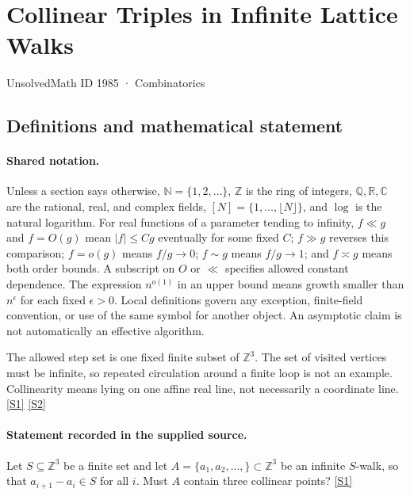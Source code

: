 \documentclass[11pt,a4paper]{article}
\newcommand{\N}{\mathbb{N}}
\newcommand{\Z}{\mathbb{Z}}
\newcommand{\Q}{\mathbb{Q}}
\newcommand{\R}{\mathbb{R}}
\newcommand{\C}{\mathbb{C}}
\newcommand{\sref}[2]{\hyperlink{source:#1:#2}{[S#2]}}
\begin{document}

\setcounter{section}{1984}

\section{Collinear Triples in Infinite Lattice Walks}\label{1985}

{\small\sffamily UnsolvedMath ID 1985 · Combinatorics}

\subsection{Definitions and mathematical statement}

\paragraph{Shared notation.}Unless a section says otherwise, $\N=\{1,2,\ldots\}$,
$\Z$ is the ring of integers, $\Q,\R,\C$ are the rational, real, and complex
fields, $[N]=\{1,\ldots,\lfloor N\rfloor\}$, and $\log$ is the natural
logarithm. For real functions of a parameter tending to infinity,
$f\ll g$ and $f=O(g)$ mean $|f|\leq Cg$ eventually for some fixed $C$;
$f\gg g$ reverses this comparison; $f=o(g)$ means $f/g\to0$;
$f\sim g$ means $f/g\to1$; and $f\asymp g$ means both order bounds.
A subscript on $O$ or $\ll$ specifies allowed constant dependence.
The expression $n^{o(1)}$ in an upper bound means growth smaller than
$n^\epsilon$ for each fixed $\epsilon>0$. Local definitions govern any
exception, finite-field convention, or use of the same symbol for another
object. An asymptotic claim is not automatically an effective algorithm.



The allowed step set is one fixed finite subset of $\Z^3$. The set of visited vertices must be infinite, so repeated circulation around a finite loop is not an example. Collinearity means lying on one affine real line, not necessarily a coordinate line. \sref{1985}{1} \sref{1985}{2}

\paragraph{Statement recorded in the supplied source.}
Let $S\subseteq \mathbb{Z}^3$ be a finite set and let $A=\{a_1,a_2,\ldots,\}\subset \mathbb{Z}^3$ be an infinite $S$-walk, so that $a_{i+1}-a_i\in S$ for all $i$. Must $A$ contain three collinear points? \sref{1985}{1}
\end{document}
